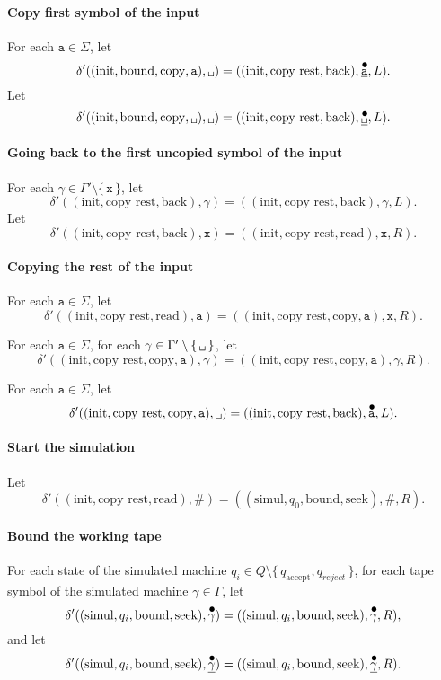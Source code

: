 \documentclass{article}
\newcommand\obullet[1]{\ThisStyle{\ensurestackMath{%
  \stackon[1pt]{\SavedStyle#1}{\SavedStyle\kern.6\LMpt\bullet}}}}
\newcommand{\0}{\texttt{\textvisiblespace}}
\newcommand{\°}{\obullet{\0}}
\newcommand{\BB}{\obullet{\underline{\0}}}
\newcommand{\A}{\obullet{\s}}
\newcommand{\HA}{\obullet{\underline{\s}}}
\newcommand{\s}{\texttt{a}}
\newcommand{\X}{\texttt{x}}
\newcommand{\e}{\texttt{\#}}
\begin{document}
\paragraph{Copy first symbol of the input}
For each $\s \in \Sigma$,
let $$\delta'((\text{init},\text{bound},\text{copy}, \s), \0{})
= ((\text{init},\text{copy rest},\text{back}), \HA, L).$$
Let $$\delta'((\text{init},\text{bound},\text{copy}, \0{}), \0{})
= ((\text{init},\text{copy rest},\text{back}), \BB, L).$$

\paragraph{Going back to the first uncopied symbol of the input}
For each $\gamma \in \Gamma' \setminus\{\,\X\,\}$,
let $$\delta'((\text{init},\text{copy rest},\text{back}), \gamma)
= ((\text{init},\text{copy rest},\text{back}), \gamma, L).$$
Let $$\delta'((\text{init},\text{copy rest},\text{back}), \X)
= ((\text{init},\text{copy rest},\text{read}), \X, R).$$

\paragraph{Copying the rest of the input}
For each $\s \in\Sigma$,
let $$\delta'((\text{init},\text{copy rest},\text{read}), \s)
= ((\text{init}, \text{copy rest}, \text{copy}, \s), \X, R).$$

For each $\s \in\Sigma$,
for each $\gamma \in\Gamma'\setminus\{\,\0{}\,\}$,
let $$\delta'((\text{init}, \text{copy rest},\text{copy}, \s), \gamma)
= ((\text{init}, \text{copy rest},\text{copy}, \s), \gamma, R).$$

For each $\s \in\Sigma$,
let $$\delta'((\text{init}, \text{copy rest},\text{copy}, \s), \0{})
= ((\text{init},\text{copy rest},\text{back}), \A, L).$$

\paragraph{Start the simulation}
Let $$\delta'((\text{init},\text{copy rest},\text{read}), \e)
= ((\text{simul},q_0, \text{bound}, \text{seek}), \e, R).$$

\paragraph{Bound the working tape}
For each state of the simulated machine $q_i \in Q \setminus
\{\,q_\text{accept},q_{reject}\,\}$,
for each tape symbol of the simulated machine $\gamma \in \Gamma$,
let $$\delta'((\text{simul}, q_i, \text{bound}, \text{seek}),\obullet{\gamma})=((\text{simul},
q_i, \text{bound}, \text{seek}),\obullet{\gamma},R),$$
and
let $$\delta'((\text{simul}, q_i, \text{bound}, \text{seek}),\underline{\obullet{\gamma}})=((\text{simul},
q_i, \text{bound}, \text{seek}),\underline{\obullet{\gamma}},R).$$
\end{document}
